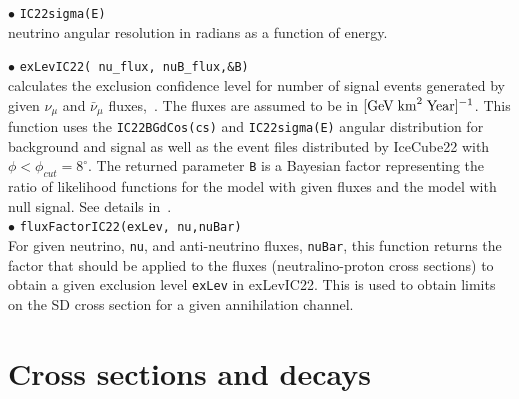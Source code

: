 \documentclass[12pt,a4paper]{article}
\begin{document}
 \noindent 
$\bullet$ \verb|IC22sigma(E)|\\
neutrino angular resolution in radians  as a function of energy. 

\noindent
$\bullet$ \verb|exLevIC22( nu_flux, nuB_flux,&B)|\\
 calculates the  exclusion confidence  level  for number of signal events 
generated by  given $\nu_{\mu}$ and  
$\bar{\nu}_{\mu}$  fluxes,~\cite{Belanger:2015hra}. The fluxes are assumed to be in
$[\rm{GeV\;km}^2\;\rm{Year}]^{-1}$.  This function uses
the \verb|IC22BGdCos(cs)| and \verb|IC22sigma(E)| angular distribution for background and 
signal as well as the event files distributed  by IceCube22 
with  $\phi<\phi_{cut}=8^{\circ} $.  The returned parameter \verb|B| is a
Bayesian  factor representing the ratio of likelihood functions for the  model
with  given fluxes and the model  with null signal.  See details in~\cite{Belanger:2015hra}.\\
\noindent  
$\bullet$ \verb|fluxFactorIC22(exLev, nu,nuBar)|\\
For given neutrino, \verb|nu|, and anti-neutrino fluxes, \verb|nuBar|, 
this function returns the factor that should be applied to the 
fluxes (neutralino-proton   cross sections)  to obtain a given exclusion
level {\tt exLev}  in exLevIC22. This is used to obtain  limits on the SD cross 
section for a given annihilation channel.

\section{Cross sections and decays}
\label{cross_section}
\end{document}
